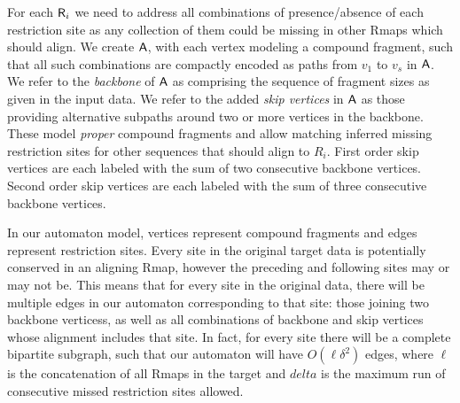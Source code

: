For each $\mbox{\rm {\sf R}}_i$ we need to address all combinations of presence/absence of each restriction site as any collection of them could be missing in other Rmaps which should align. We create $\mathsf{A}$, with each vertex modeling a compound fragment, such that all such combinations are compactly encoded as paths from $v_1$ to $v_s$ in $\mathsf{A}$.  We refer to the {\em backbone} of $\mathsf{A}$ as comprising the sequence of fragment sizes as given in the input data. We refer to the added {\em skip vertices} in $\mathsf{A}$ as those providing alternative subpaths around two or more vertices in the backbone.  These model \emph{proper} compound fragments and allow matching inferred missing restriction sites for other sequences that should align to $R_i$.  First order skip vertices are each labeled with the sum of two consecutive backbone vertices.  Second order skip vertices are each labeled with the sum of three consecutive backbone vertices. %

In our automaton model, vertices represent compound fragments and edges represent restriction sites. Every site in the original target data is potentially conserved in an aligning Rmap, however the preceding and following sites may or may not be.  This means that for every site in the original data, there will be multiple edges in our automaton corresponding to that site: those joining two backbone verticess, as well as all combinations of backbone and skip vertices whose alignment includes that site.  In fact, for every site there will be a complete bipartite subgraph, such that our automaton will have $O(\ell \delta^2)$ edges, where $\ell$ is the concatenation of all Rmaps in the target and $delta$ is the maximum run of consecutive missed restriction sites allowed.


